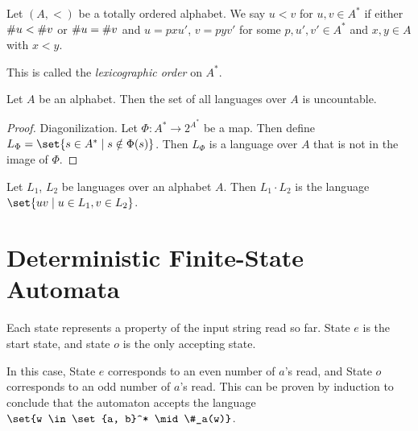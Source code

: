 \begin{definition} \label{def:languages:lexicographic}
    Let $(A, <)$ be a totally ordered alphabet.
    We say $u < v$ for $u, v \in A^*$ if either $\# u < \# v$ or
    $\# u = \# v$ and $u = pxu'$, $v = pyv'$ for some $p, u', v' \in A^*$
    and $x, y \in A$ with $x < y$.

    This is called the \emph{lexicographic order} on $A^*$.
\end{definition}

\begin{proposition}
    Let $A$ be an alphabet.
    Then the set of all languages over $A$ is uncountable.
\end{proposition}
\begin{proof}
    Diagonilization.
    Let $\Phi\colon A^* \to 2^{A^*}$ be a map.
    Then define $L_\Phi = \set{s \in A^* \mid s \notin \Phi(s)}$.
    Then $L_\Phi$ is a language over $A$ that is not in the image of $\Phi$.
\end{proof}

\begin{definition}[Concatenations] \label{def:languages:concatenations}
    Let $L_1$, $L_2$ be languages over an alphabet $A$.
    Then $L_1 \cdot L_2$ is the language $\set{uv \mid u \in L_1, v \in L_2}$.
\end{definition}

\section{Deterministic Finite-State Automata} \label{sec:dfa}
\begin{center}
\end{center}
Each state represents a property of the input string read so far.
State $e$ is the start state, and state $o$ is the only accepting state.

In this case, State $e$ corresponds to an even number of $a$'s read,
and State $o$ corresponds to an odd number of $a$'s read.
This can be proven by induction to conclude that the automaton accepts the
language $\set{w \in \set{a, b}^* \mid \#_a(w)}$.

